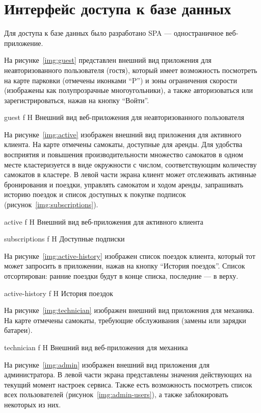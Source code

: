 \section{Интерфейс доступа к базе данных}

Для доступа к базе данных было разработано SPA --- одностраничное веб-приложение.

На рисунке~\ref{img:guest} представлен внешний вид приложения для неавторизованного пользователя (гостя), который имеет возможность посмотреть на карте парковки (отмечены иконками \enquote{P}) и зоны ограничения скорости (изображены как полупрозрачные многоугольники), а также авторизоваться или зарегистрироваться, нажав на кнопку \enquote{Войти}.

{guest}
{f}
{H}
{\textwidth}
{Внешний вид веб-приложения для неавторизованного пользователя}

На рисунке~\ref{img:active} изображен внешний вид приложения для активного клиента. На карте отмечены самокаты, доступные для аренды. Для удобства восприятия и повышения производительности множество самокатов в одном месте кластеризуется в виде окружности с числом, соответствующим количеству самокатов в кластере. В левой части экрана клиент может отслеживать активные бронирования и поездки, управлять самокатом и ходом аренды, запрашивать историю поездок и список доступных к покупке подписок (рисунок~\ref{img:subscriptions}).

{active}
{f}
{H}
{\textwidth}
{Внешний вид веб-приложения для активного клиента}

{subscriptions}
{f}
{H}
{\textwidth}
{Доступные подписки}

На рисунке~\ref{img:active-history} изображен список поездок клиента, который тот может запросить в приложении, нажав на кнопку \enquote{История поездок}. Список отсортирован: ранние поездки будут в конце списка, последние --- в верху.

{active-history}
{f}
{H}
{\textwidth}
{История поездок}

На рисунке~\ref{img:technician} изображен внешний вид приложения для механика. На карте отмечены самокаты, требующие обслуживания (замены или зарядки батареи).

{technician}
{f}
{H}
{\textwidth}
{Внешний вид веб-приложения для механика}

На рисунке~\ref{img:admin} изображен внешний вид приложения для администратора. В левой части экрана представлены значения действующих на текущий момент настроек сервиса. Также есть возможность посмотреть список всех пользователей (рисунок~\ref{img:admin-users}), а также заблокировать некоторых из них.

